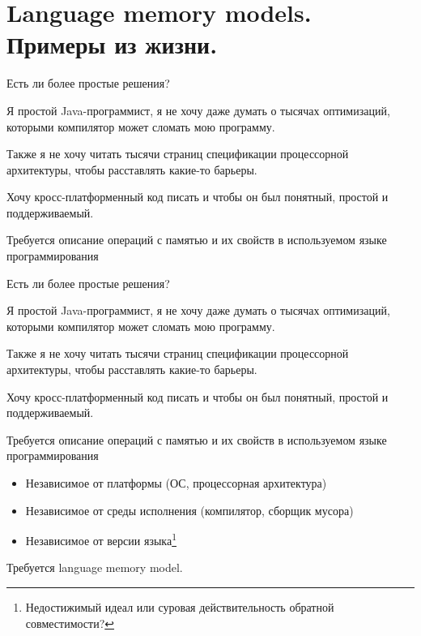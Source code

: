 \section{Language memory models. Примеры из жизни.}
\showTOC

\begin{frame}[t]{Есть ли более простые решения?}

Я простой Java-программист, я не хочу даже думать о тысячах оптимизаций, которыми компилятор может сломать мою программу.

\pause
Также я не хочу читать тысячи страниц спецификации процессорной архитектуры, чтобы расставлять какие-то барьеры. 

\pause
{}


\pause
\pause
Хочу кросс-платформенный код писать и чтобы он был понятный, простой и поддерживаемый.

\pause

Требуется описание операций с памятью и их свойств в используемом языке программирования
\end{frame}


\begin{frame}[t]{Есть ли более простые решения?}

Я простой Java-программист, я не хочу даже думать о тысячах оптимизаций, которыми компилятор может сломать мою программу.

Также я не хочу читать тысячи страниц спецификации процессорной архитектуры, чтобы расставлять какие-то барьеры. 

Хочу кросс-платформенный код писать и чтобы он был понятный, простой и поддерживаемый.

Требуется описание операций с памятью и их свойств в используемом языке программирования
\begin{itemize}
	\item Независимое от платформы (ОС, процессорная архитектура) 
	\item Независимое от среды исполнения (компилятор, сборщик мусора)
	\item Независимое от версии языка\footnote{Недостижимый идеал или суровая действительность обратной совместимости?} 
\end{itemize}

\pause
Требуется language memory model.
\end{frame}


